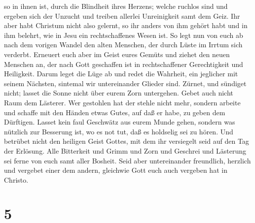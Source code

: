 so in ihnen ist, durch die Blindheit ihres Herzens;  welche
ruchlos sind und ergeben sich der Unzucht und treiben allerlei
Unreinigkeit samt dem Geiz.  Ihr aber habt Christum nicht
also gelernt,  so ihr anders von ihm gehört habt und in ihm
belehrt, wie in Jesu ein rechtschaffenes Wesen ist.  So
legt nun von euch ab nach dem vorigen Wandel den alten Menschen, der
durch Lüste im Irrtum sich verderbt.  Erneuert euch aber im
Geist eures Gemüts  und ziehet den neuen Menschen an, der
nach Gott geschaffen ist in rechtschaffener Gerechtigkeit und
Heiligkeit.  Darum leget die Lüge ab und redet die
Wahrheit, ein jeglicher mit seinem Nächsten, sintemal wir untereinander
Glieder sind.  Zürnet, und sündiget nicht; lasset die Sonne
nicht über eurem Zorn untergehen.  Gebet auch nicht Raum
dem Lästerer.  Wer gestohlen hat der stehle nicht mehr,
sondern arbeite und schaffe mit den Händen etwas Gutes, auf daß er habe,
zu geben dem Dürftigen.  Lasset kein faul Geschwätz aus
eurem Munde gehen, sondern was nützlich zur Besserung ist, wo es not
tut, daß es holdselig sei zu hören.  Und betrübet nicht den
heiligen Geist Gottes, mit dem ihr versiegelt seid auf den Tag der
Erlösung.  Alle Bitterkeit und Grimm und Zorn und Geschrei
und Lästerung sei ferne von euch samt aller Bosheit.  Seid
aber untereinander freundlich, herzlich und vergebet einer dem andern,
gleichwie Gott euch auch vergeben hat in Christo.

\hypertarget{section-4}{%
\section{5}\label{section-4}}

